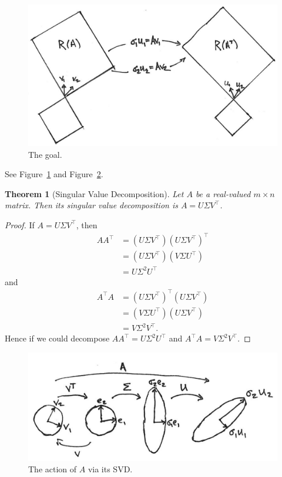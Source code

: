 \documentclass[]{article}
\theoremstyle{plain}
\newtheorem{thm}{Theorem}
\theoremstyle{definition}
\theoremstyle{remark}
\begin{document}
\begin{figure}
  \begin{centering}
    \includegraphics[width=5in]{fig/svd-hope.png}\par
  \end{centering}
  \caption{\label{fig:svd1}The goal.}
\end{figure}

See Figure~\ref{fig:svd1} and Figure~\ref{fig:svd2}.

\begin{thm}[Singular Value Decomposition]
Let $A$ be a real-valued $m \times n$ matrix.  Then its singular value
decomposition is $A = U \Sigma V^\top$.
\end{thm}
\begin{proof}
If $A = U \Sigma V^\top$, then
\begin{align*}
AA^\top &= (U \Sigma V^\top)(U \Sigma V^\top)^\top \\
    &= (U \Sigma V^\top)(V \Sigma U^\top) \\
    &= U \Sigma^2 U^\top
\end{align*}
and
\begin{align*}
A^\top A &= (U \Sigma V^\top)^\top (U \Sigma V^\top) \\
   &= (V \Sigma U^\top)  (U \Sigma V^\top) \\
   &= V \Sigma^2 V^\top.
\end{align*}
Hence if we could decompose $AA^\top = U \Sigma^2 U^\top$ and
$A^\top A = V \Sigma^2 V^\top$.
\end{proof}

\begin{figure}
  \begin{centering}
    \includegraphics[width=5in]{fig/action-via-svd.png}\par
  \end{centering}
  \caption{\label{fig:svd2}The action of $A$ via its SVD.}
\end{figure}
\end{document}
